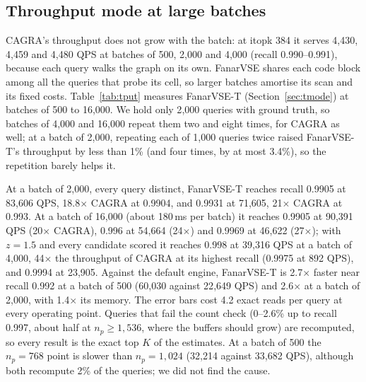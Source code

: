 \documentclass[fleqn,10pt]{wlscirep}
\begin{document}
\subsection{Throughput mode at large batches}\label{sec:tput}
CAGRA's throughput does not grow with the batch: at itopk 384 it serves 4{,}430, 4{,}459 and 4{,}480 QPS at batches of 500, 2{,}000 and 4{,}000 (recall 0.990--0.991), because each query walks the graph on its own. FanarVSE shares each code block among all the queries that probe its cell, so larger batches amortise its scan and its fixed costs. Table~\ref{tab:tput} measures FanarVSE-T (Section~\ref{sec:tmode}) at batches of 500 to 16{,}000. We hold only 2{,}000 queries with ground truth, so batches of 4{,}000 and 16{,}000 repeat them two and eight times, for CAGRA as well; at a batch of 2{,}000, repeating each of 1{,}000 queries twice raised FanarVSE-T's throughput by less than 1\% (and four times, by at most 3.4\%), so the repetition barely helps it.

At a batch of 2{,}000, every query distinct, FanarVSE-T reaches recall 0.9905 at 83{,}606 QPS, 18.8$\times$ CAGRA at 0.9904, and 0.9931 at 71{,}605, 21$\times$ CAGRA at 0.993. At a batch of 16{,}000 (about 180\,ms per batch) it reaches 0.9905 at 90{,}391 QPS (20$\times$ CAGRA), 0.996 at 54{,}664 (24$\times$) and 0.9969 at 46{,}622 (27$\times$); with $z=1.5$ and every candidate scored it reaches 0.998 at 39{,}316 QPS at a batch of 4{,}000, 44$\times$ the throughput of CAGRA at its highest recall (0.9975 at 892 QPS), and 0.9994 at 23{,}905. Against the default engine, FanarVSE-T is 2.7$\times$ faster near recall 0.992 at a batch of 500 (60{,}030 against 22{,}649 QPS) and 2.6$\times$ at a batch of 2{,}000, with 1.4$\times$ its memory. The error bars cost 4.2 exact reads per query at every operating point. Queries that fail the count check (0--2.6\% up to recall 0.997, about half at $n_p\ge1{,}536$, where the buffers should grow) are recomputed, so every result is the exact top $K$ of the estimates. At a batch of 500 the $n_p=768$ point is slower than $n_p=1{,}024$ (32{,}214 against 33{,}682 QPS), although both recompute 2\% of the queries; we did not find the cause.
\end{document}
